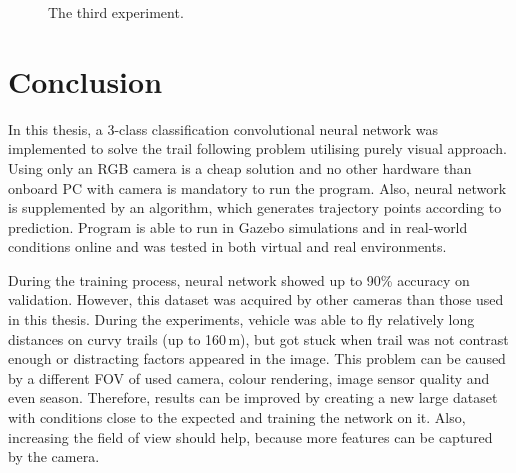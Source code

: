 \begin{figure}[!h]

  \centering

  \centering	
  


  \caption{The third experiment.}
  \label{fig:third_trail_photos}
\end{figure}


\chapter{Conclusion}


In this thesis, a 3-class classification convolutional neural network was implemented to solve the trail following problem utilising purely visual approach. Using only an RGB camera is a cheap solution and no other hardware than onboard PC with camera is mandatory to run the program. Also, neural network is supplemented by an algorithm, which generates trajectory points according to prediction. Program is able to run in Gazebo simulations and in real-world conditions online and was tested in both virtual and real environments.

During the training process, neural network showed up to 90\% accuracy on validation. However, this dataset was acquired by other cameras than those used in this thesis. During the experiments, vehicle was able to fly relatively long distances on curvy trails (up to 160\,m), but got stuck when trail was not contrast enough or distracting factors appeared in the image. This problem can be caused by a different \acs{FOV} of used camera, colour rendering, image sensor quality and even season. Therefore, results can be improved by creating a new large dataset with conditions close to the expected and training the network on it. Also, increasing the field of view should help, because more features can be captured by the camera.

